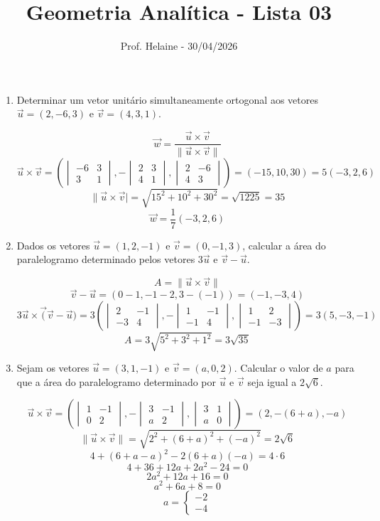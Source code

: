 \documentclass[
  12pt,
  openright,
  a4paper,
  twoside,
  english,
  brazil,
]{article}
\title{Geometria Analítica - Lista 03}
\author{Prof. Helaine - 30/04/2026}
\date{}
\newcommand{\dt}[1]{
  \begin{vmatrix}#1
\end{vmatrix}}
\begin{document}
\maketitle

\begin{enumerate}[\bfseries  1.]
  \item Determinar um vetor unitário simultaneamente ortogonal aos
    vetores $\vec u=(2,-6,3)$ e $\vec v=(4,3,1)$.

    $$\vec w=\frac{\vec u\times\vec v}{\|\vec u\times \vec v\|}$$
    $$\vec u\times\vec
    v=(\dt{-6 & 3\\3 & 1},-\dt{2 & 3\\4 & 1},\dt{2 & -6\\4 &
    3})=(-15,10,30)=5(-3,2,6)
    $$
    $$\|\vec u\times\vec v|=\sqrt{15^2+10^2+30^2}=\sqrt{1225}=35$$
    $$\vec w=\frac{1}{7}(-3,2,6)$$

  \item Dados os vetores $\vec u=(1,2,-1)$ e $\vec v=(0,-1,3)$,
    calcular a área do paralelogramo determinado pelos vetores $3\vec
    u$ e $\vec v-\vec u$.

    $$A=\|\vec u\times \vec v\|$$
    $$\vec v-\vec u=(0-1,-1-2,3-(-1))=(-1,-3,4)$$
    $$3\vec u\times\vec (\vec v-\vec u)=3(\dt{2 & -1\\-3 & 4}, -\dt{1
    & -1\\-1 & 4}, \dt{1 & 2\\-1 & -3})=3(5,-3,-1)$$
    $$A=3\sqrt{5^2+3^2+1^2}=3\sqrt{35}$$

  \item Sejam os vetores $\vec u=(3,1,-1)$ e $\vec v = (a,0,2)$.
    Calcular o valor de $a$ para que a área do paralelogramo
    determinado por $\vec u$ e $\vec v$ seja igual a $2\sqrt 6$.

    $$
    \vec u\times\vec v=(\dt{1 & -1\\0 & 2}, -\dt{3 & -1\\a & 2}, \dt{3
    & 1\\a & 0})=(2,-(6+a),-a)
    $$
    $$\|\vec u\times\vec v\|=\sqrt{2^2+(6+a)^2+(-a)^2}=2\sqrt{6}$$
    $$4+(6+a-a)^2-2(6+a)(-a)=4\cdot 6$$
    $$4+36+12a+2a^2-24=0$$
    $$2a^2+12a+16=0$$
    $$a^2+6a+8=0$$
    $$a=
    \begin{cases}-2\\-4
    \end{cases}$$

\end{enumerate}
\end{document}

